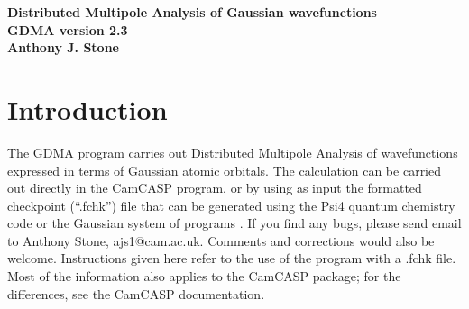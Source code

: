 \documentclass[12pt,txfonts]{paper}
\let\cite=\citep
\begin{document}
\begin{center}
\textbf{Distributed Multipole Analysis of Gaussian wavefunctions\\[3pt]
GDMA version 2.3\\[4 pt]
Anthony J. Stone}
\end{center}

\section{Introduction}

The GDMA program carries out Distributed Multipole Analysis of
wavefunctions expressed in terms of Gaussian atomic orbitals.
The calculation can be carried out directly in the CamCASP
program\cite{CamCASP6.0}, or
by using as input the formatted checkpoint (``.fchk'') file
that can be generated using the Psi4 quantum chemistry code\cite{psi4} or the
Gaussian system of programs\cite{Gaussian16}
.
If you find any bugs, please send email to Anthony
Stone, ajs1@cam.ac.uk. Comments and corrections would also be welcome.
Instructions given here refer to the use of the program with a .fchk file.
Most of the information also applies to the {\sc CamCASP} package; for
the differences, see the {\sc CamCASP} documentation.
\end{document}
